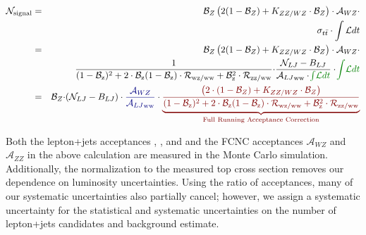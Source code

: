 \label{eq:fullacc}
\begin{eqnarray*}
{\mathcal N}_\textrm{signal} &=& \bz
           \left( 2 (1 - \bz) + K_{ZZ/WZ} \cdot \bz \right) \cdot
           {\mathcal A}_{WZ} \cdot \\
& & \sigma_{t \bar{t}} \cdot \int {\mathcal L} dt\\
&=&  \bz
           \left( 2 (1 - \bz) + K_{ZZ/WZ} \cdot \bz \right) \cdot
           {\mathcal A}_{WZ} \cdot \\
& & 
  \frac{1}
{(1-\betaz)^2 + 2\cdot\betaz(1-\betaz)\cdot\rlj{wz} + \betaz^2 \cdot
\rlj{zz}}
{\bf \cdot} \frac {{\mathcal N}_{LJ} - B_{LJ}}
{\alj{ww} \cdot {\color[rgb]{0, 0.5, 0} \lum}} \cdot {\color[rgb]{0,
0.5, 0}\lum} \\
&=&  \bz {\bf \cdot}
  ( {\mathcal N}_{LJ} - B_{LJ}) \cdot {\color[rgb]{0, 0, 0.5} \frac {
{\mathcal A}_{WZ} } {\alj{ww}}}
\cdot
{\color[rgb]{0.5, 0, 0}
\underbrace{ \frac{\left( 2 \cdot (1 - \bz) + K_{ZZ/WZ} \cdot \bz \right)}
{(1-\betaz)^2 + 2\cdot\betaz(1-\betaz)\cdot\rlj{wz} + \betaz^2 \cdot
\rlj{zz}}
}_\textrm{Full Running Acceptance Correction} }
  \\
\end{eqnarray*}

Both the lepton+jets acceptances , ,
and  and the FCNC acceptances ${\mathcal A}_{WZ}$ and ${\mathcal A}_{ZZ}$
in the above calculation are measured in the Monte Carlo simulation. Additionally, the 
normalization to the measured top cross section removes our
dependence on luminosity uncertainties. Using the ratio of acceptances, 
many of our systematic uncertainties also partially cancel; however, we 
assign a systematic uncertainty for the statistical and systematic 
uncertainties on the number of lepton+jets candidates and background estimate.
 

